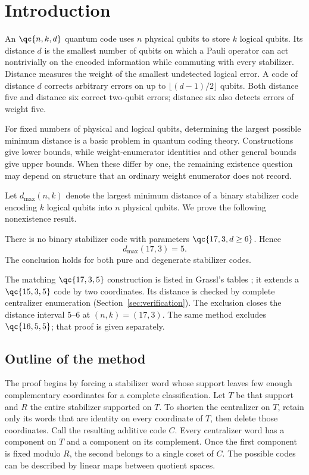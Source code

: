 \section{Introduction}

An \(\qc{n,k,d}\) quantum code uses \(n\) physical qubits to store
\(k\) logical qubits. Its distance \(d\) is the smallest number of
qubits on which a Pauli operator can act nontrivially on the encoded
information while commuting with every stabilizer. Distance measures
the weight of the smallest undetected logical error. A code of distance
\(d\) corrects arbitrary errors on up to \(\lfloor(d-1)/2\rfloor\)
qubits. Both distance five and distance six correct two-qubit errors;
distance six also detects errors of weight five.

For fixed numbers of physical and logical qubits, determining the largest
possible minimum distance is a basic problem in quantum coding theory.
Constructions give lower bounds, while weight-enumerator identities and
other general bounds give upper bounds. When these differ by one, the
remaining existence question may depend on structure that an ordinary
weight enumerator does not record.

Let \(d_{\max}(n,k)\) denote the largest minimum distance of a binary
stabilizer code encoding \(k\) logical qubits into \(n\) physical qubits.
We prove the following nonexistence result.
\begin{theorem}\label{thm:main}
There is no binary stabilizer code with parameters
\(\qc{17,3,d\geq6}\). Hence
\[
 d_{\max}(17,3)=5.
\]
The conclusion holds for both pure and degenerate stabilizer codes.
\end{theorem}
The matching \(\qc{17,3,5}\) construction is listed in Grassl's tables
\cite{grassl}; it extends a \(\qc{15,3,5}\) code by two coordinates.
Its distance is checked by complete centralizer enumeration
(Section~\ref{sec:verification}). The exclusion closes the distance
interval \(5\)--\(6\) at \((n,k)=(17,3)\).
The same method excludes \(\qc{16,5,5}\); that proof is given separately.

\subsection{Outline of the method}

The proof begins by forcing a stabilizer word whose support leaves few
enough complementary coordinates for a complete classification. Let
\(T\) be that support and \(R\) the entire stabilizer supported on
\(T\). To shorten the centralizer on \(T\), retain only its words that
are identity on every coordinate of \(T\), then delete those coordinates.
Call the resulting additive code \(C\).
Every centralizer word has a component on \(T\) and a component on its
complement. Once the first component is fixed modulo \(R\), the second
belongs to a single coset of \(C\). The possible codes can be
described by linear maps between quotient spaces.

